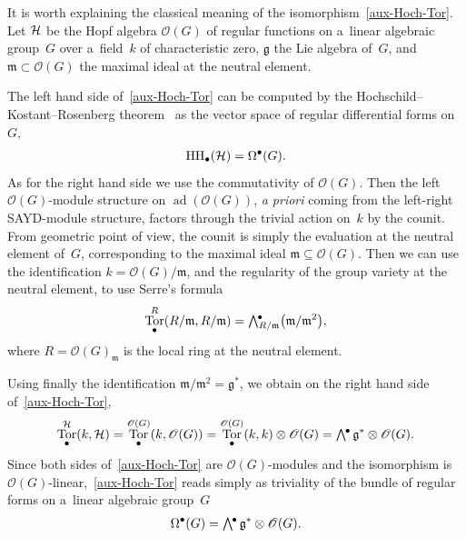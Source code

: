 \documentclass[pdftex]{sigma}
\numberwithin{equation}{section}
\DeclareMathOperator{\ad}{ad}
\DeclareMathOperator{\Tor}{Tor}
\newcommand{\Exterior}{\mathchoice{{\textstyle\bigwedge}}%
    {{\bigwedge}}%
    {{\textstyle\wedge}}%
    {{\scriptstyle\wedge}}}
\begin{document}
\begin{Remark}
It is worth explaining the classical meaning of the isomorphism~\eqref{aux-Hoch-Tor}.
Let ${\cal H}$ be the Hopf algebra $\mathscr{O}(G)$ of regular functions on a~linear algebraic group~$G$ over
a~f\/ield~$k$ of characteristic zero, $\mathfrak{g}$ the Lie algebra of~$G$, and $\mathfrak{m}\subset\mathscr{O}(G)$ the
maximal ideal at the neutral element.

The left hand side of~\eqref{aux-Hoch-Tor} can be computed by the Hochschild--Kostant--Rosenberg
theorem~\cite{HochKostRose62} as the vector space of regular dif\/ferential forms on~$G$,
\begin{gather*}
{\rm HH}_\bullet({\cal H})=\Omega^\bullet(G).
\end{gather*}
As for the right hand side we use the commutativity of $\mathscr{O}(G)$.
Then the left $\mathscr{O}(G)$-module structure on $\ad(\mathscr{O}(G))$, \emph{a priori} coming from the
left-right SAYD-module structure, factors through the trivial action on~$k$ by the counit.
From geometric point of view, the counit is simply the evaluation at the neutral element of~$G$, corresponding to the
maximal ideal $\mathfrak{m}\subseteq \mathscr{O}(G)$.
Then we can use the identif\/ication $k={\mathscr O}(G)/\mathfrak{m}$, and the regularity of the group variety at the
neutral element, to use Serre's formula
\begin{gather*}%
\Tor^{R}_{\bullet}(R/\mathfrak{m},
R/\mathfrak{m})=\Exterior^{\hspace{-0.1em}\bullet}_{R/\mathfrak{m}}\big(\mathfrak{m}/\mathfrak{m}^2\big),
\end{gather*}
where $R={\mathscr O}(G)_{\mathfrak{m}}$ is the local ring at the neutral element.

Using f\/inally the identif\/ication $\mathfrak{m}/\mathfrak{m}^2=\mathfrak{g}^{*}$, we obtain on the right hand side
of~\eqref{aux-Hoch-Tor},
\begin{gather*}
\Tor^{{\cal H}}_{\bullet}(k,{\cal H})=\Tor^{\mathscr{O}(G)}_{\bullet}(k,\mathscr{O}(G))
=\Tor^{\mathscr{O}(G)}_{\bullet}(k,k)\otimes\mathscr{O}(G)
=\Exterior^{\hspace{-0.1em}\bullet}\hspace{0.15em}\mathfrak{g}^{*}\otimes
\mathscr{O}(G).
\end{gather*}
Since both sides of~\eqref{aux-Hoch-Tor} are $\mathscr{O}(G)$-modules and the isomorphism is
$\mathscr{O}(G)$-linear,~\eqref{aux-Hoch-Tor} reads simply as triviality of the bundle of regular forms on a~linear
algebraic group~$G$
\begin{gather*}%
\Omega^\bullet(G)=\Exterior^{\hspace{-0.1em}\bullet}\hspace{0.15em}\mathfrak{g}^{*}\otimes \mathscr{O}(G).
\end{gather*}
\end{Remark}
\end{document}
